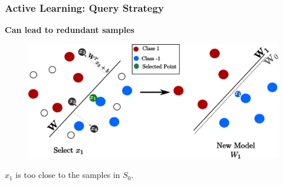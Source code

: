 \documentclass[11pts]{beamer}
\begin{document}
\begin{frame}%
\frametitle{Active Learning: Query Strategy }

\begin{center}
 \textbf{Can lead to redundant samples}   
\end{center}


\begin{figure}
  \begin{center}
  \vspace{-0.5cm}
    \includegraphics[scale=0.4]{IM/SELECTING.pdf}
  \end{center}
\end{figure}

\begin{center}
    $x_1$ is too close to  the  samples in $S_{0}$.
\end{center}


\end{frame}
\end{document}
